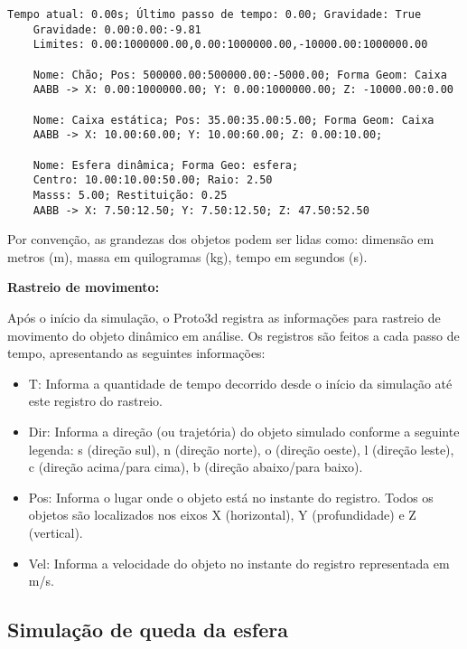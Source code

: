\documentclass[12pt]{article}
\begin{document}
\begin{lstlisting}[frame=single,caption=Inicialização do ambiente\label{lg:init_world}]
	Tempo atual: 0.00s; Último passo de tempo: 0.00; Gravidade: True
	Gravidade: 0.00:0.00:-9.81
	Limites: 0.00:1000000.00,0.00:1000000.00,-10000.00:1000000.00
	
	Nome: Chão; Pos: 500000.00:500000.00:-5000.00; Forma Geom: Caixa
	AABB -> X: 0.00:1000000.00; Y: 0.00:1000000.00; Z: -10000.00:0.00 
	
	Nome: Caixa estática; Pos: 35.00:35.00:5.00; Forma Geom: Caixa
	AABB -> X: 10.00:60.00; Y: 10.00:60.00; Z: 0.00:10.00; 
	
	Nome: Esfera dinâmica; Forma Geo: esfera; 
	Centro: 10.00:10.00:50.00; Raio: 2.50
	Masss: 5.00; Restituição: 0.25
	AABB -> X: 7.50:12.50; Y: 7.50:12.50; Z: 47.50:52.50
\end{lstlisting}

Por convenção, as grandezas dos objetos podem ser lidas como: dimensão em metros (m), massa em quilogramas (kg), tempo em segundos (s).

\noindent\textbf{Rastreio de movimento:}

Após o início da simulação, o Proto3d registra as informações para rastreio de movimento do objeto dinâmico em análise. Os registros são feitos a cada passo de tempo, apresentando as seguintes informações:

\begin{itemize}
\item T: Informa a quantidade de tempo decorrido desde o início da simulação até este registro do rastreio.
\item Dir: Informa a direção (ou trajetória) do objeto simulado conforme a seguinte legenda: s (direção sul), n (direção norte), o (direção oeste), l (direção leste), c (direção acima/para cima), b (direção abaixo/para baixo).

\item Pos: Informa o lugar onde o objeto está no instante do registro. Todos os objetos são localizados nos eixos X (horizontal), Y (profundidade) e Z (vertical).

\item Vel: Informa a velocidade do objeto no instante do registro representada em m/s.
\end{itemize}

\subsection{Simulação de queda da esfera }
\end{document}

